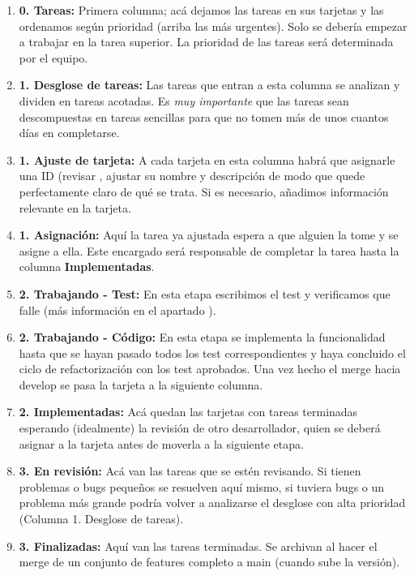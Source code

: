 \begin{enumerate}
	\item \textbf{0. Tareas:} Primera columna; acá dejamos las tareas en sus tarjetas y las ordenamos según prioridad (arriba las más urgentes). Solo se debería empezar a trabajar en la tarea superior. La prioridad de las tareas será determinada por el equipo.
	
	\item \textbf{1. Desglose de tareas:} Las tareas que entran a esta columna se analizan y dividen en tareas acotadas. Es \textit{muy importante} que las tareas sean descompuestas en tareas sencillas para que no tomen más de unos cuantos días en completarse.
	
	\item \textbf{1. Ajuste de tarjeta:} A cada tarjeta en esta columna habrá que asignarle una ID (revisar , ajustar su nombre y descripción de modo que quede perfectamente claro de qué se trata. Si es necesario, añadimos información relevante en la tarjeta.

	\item \textbf{1. Asignación:} Aquí la tarea ya ajustada espera a que alguien la tome y se asigne a ella. Este encargado será responsable de completar la tarea hasta la columna \textbf{Implementadas}.
	
	\item \textbf{2. Trabajando - Test:} En esta etapa escribimos el test y verificamos que falle (más información en el apartado ).
	
	\item \textbf{2. Trabajando - Código:} En esta etapa se implementa la funcionalidad hasta que se hayan pasado todos los test correspondientes y haya concluido el ciclo de refactorización con los test aprobados. Una vez hecho el merge hacia develop se pasa la tarjeta a la siguiente columna.
	
	\item \textbf{2. Implementadas:} Acá quedan las tarjetas con tareas terminadas esperando (idealmente) la revisión de otro desarrollador, quien se deberá asignar a la tarjeta antes de moverla a la siguiente etapa.
	
	\item \textbf{3. En revisión:} Acá van las tareas que se estén revisando. Si tienen problemas o bugs pequeños se resuelven aquí mismo, si tuviera bugs o un problema más grande podría volver a analizarse el desglose con alta prioridad (Columna 1. Desglose de tareas).
	
	\item \textbf{3. Finalizadas:} Aquí van las tareas terminadas. Se archivan al hacer el merge de un conjunto de features completo a main (cuando sube la versión).
\end{enumerate}

